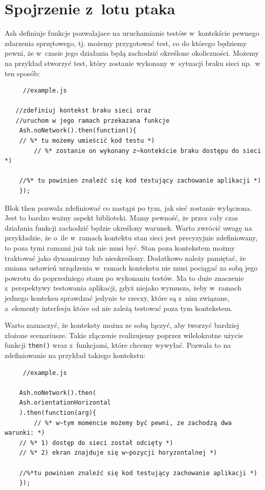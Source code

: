 \documentclass[brudnopis]{xmgr}
\begin{document}
\section{Spojrzenie z~lotu ptaka}

Ash definiuje funkcje pozwalajace na uruchamianie testów w~kontekście pewnego zdarzenia sprzętowego, tj. możemy przygotować test, co do którego będziemy pewni, że w~czasie jego działania będą zachodzić określone okoliczności. Możemy na przykład stworzyć test, który zostanie wykonany w~sytuacji braku sieci np.~w ten sposób:

\begin{lstlisting}
     //example.js

   //zdefiniuj kontekst braku sieci oraz 
   //uruchom w jego ramach przekazana funkcje
    Ash.noNetwork().then(function(){
	// %* tu możemy umieścić kod testu *)
     	// %* zostanie on wykonany z~kontekście braku dostępu do sieci *)

	//%* tu powinien znaleźć się kod testujący zachowanie aplikacji *) 
    });
\end{lstlisting}

Blok then pozwala zdefiniować co nastąpi po tym, jak sieć zostanie wyłączona. Jest to bardzo ważny aspekt biblioteki. Mamy pewność, że przez cały czas działania funkcji zachodzić będzie określony warunek. Warto zwrócić uwagę na przykładzie, że o~ile w~ramach kontektu stan sieci jest precyzyjnie zdefiniowany, to poza tymi ramami już tak nie musi być. Stan poza kontekstem możmy traktować jako dynamiczny lub nieokreślony. Dodatkowo należy pamiętać, że zmiana ustawień urządzenia w~ramach kontekstu nie musi pociągać za sobą jego powrotu do poprzedniego stanu po wykonaniu testów. Ma to duże znaczenie z~perspektywy testowania aplikacji, gdyż niejako wymusza, żeby w~ramach jednego konteksu sprawdzać jedynie te rzeczy, które są z~nim związane, a~elementy interfesju które od nie zależą testować poza tym kontekstem.

Warto zaznaczyć, że konteksty można ze sobą łączyć, aby tworzyć bardziej złożone scenariusze. Takie złączenie realizujemy poprzez wilelokrotne użycie funkcji \texttt{then()} wraz z~funkcjami, które chcemy wywyłać. Pozwala to na zdefiniowanie na przykład takiego kontekstu:

\begin{lstlisting}
     //example.js

    Ash.noNetwork().then(
	Ash.orientationHorizontal
    ).then(function(arg){
      	// %* w~tym momencie możemy być pewni, ze zachodzą dwa warunki: *)
	// %* 1) dostęp do sieci został odcięty *) 
	// %* 2) ekran znajduje się w~pozycji horyzontalnej *)

	//%*tu powinien znaleźć się kod testujący zachowanie aplikacji *) 
    });
\end{lstlisting}
\end{document}
